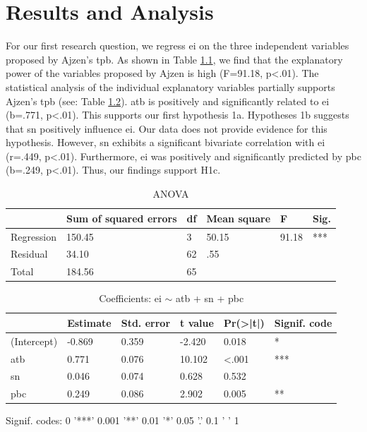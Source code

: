 \chapter{Results and Analysis}
\label{chapter:results}
For our first research question, we regress \ac{ei} on the three independent variables proposed by Ajzen's \ac{tpb}. As shown in Table \ref{ANOVA}, we find that the explanatory power of the variables proposed by Ajzen is high (F=91.18, p<.01). The statistical analysis of the individual explanatory variables partially supports Ajzen's \ac{tpb} (see: Table \ref{Coefficients}). \ac{atb} is positively and significantly related to \ac{ei} (b=.771, p<.01). This supports our first hypothesis 1a. Hypotheses 1b suggests that \ac{sn} positively influence \ac{ei}. Our data does not provide evidence for this hypothesis. However, \ac{sn} exhibits a significant bivariate correlation with \ac{ei} (r=.449, p<.01). Furthermore, \ac{ei} was positively and significantly predicted by \ac{pbc} (b=.249, p<.01). Thus, our findings support H1c.

\begin{table}[H]
\centering
\caption{ANOVA}
\label{ANOVA}
\begin{tabular}{@{}llllll@{}}
\toprule
            & Sum of squared errors & df & Mean square & F & Sig. \\ \midrule
Regression & 150.45 & 3 & 50.15  & 91.18             & ***            \\
Residual & 34.10  & 62 & .55  &            &        \\
Total & 184.56  & 65 &    &              &              \\ \bottomrule 
\end{tabular}
\end{table} 

\begin{table}[H]
\centering
\caption{Coefficients: \ac{ei} $\sim$ \ac{atb} + \ac{sn} + \ac{pbc}}
\label{Coefficients}
\begin{tabular}{@{}llllll@{}}
\toprule
            & Estimate & Std. error & t value & Pr(\textgreater|t|) & Signif. code \\ \midrule
(Intercept) & -0.869 & 0.359    & -2.420  & 0.018             & *            \\
\ac{atb}          & 0.771  & 0.076    & 10.102  & <.001            & ***          \\
\ac{sn}          & 0.046  & 0.074    & 0.628   & 0.532             &              \\
\ac{pbc}         &  0.249  &  0.086    & 2.902   & 0.005             & **           \\ \bottomrule
\end{tabular}
\end{table}
\begin{center}
\begin{footnotesize}
Signif. codes:  0 '***' 0.001 '**' 0.01 '*' 0.05 '.' 0.1 ' ' 1
\end{footnotesize}
\end{center}

